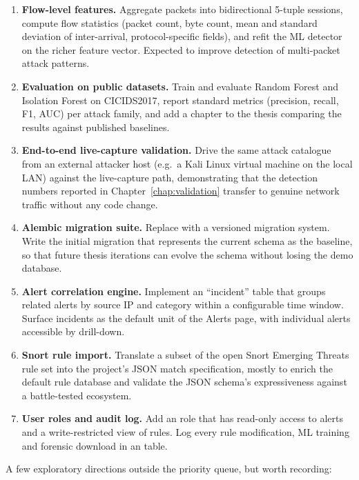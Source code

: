 \begin{enumerate}
  \item \textbf{Flow-level features.} Aggregate packets into
    bidirectional 5-tuple sessions, compute flow statistics
    (packet count, byte count, mean and standard deviation of
    inter-arrival, protocol-specific fields), and refit the ML
    detector on the richer feature vector. Expected to improve
    detection of multi-packet attack patterns.
  \item \textbf{Evaluation on public datasets.} Train and
    evaluate Random Forest and Isolation Forest on
    CICIDS2017, report standard metrics (precision, recall,
    F1, AUC) per attack family, and add a chapter to the
    thesis comparing the results against published baselines.
  \item \textbf{End-to-end live-capture validation.} Drive the
    same attack catalogue from an external attacker host
    (e.g.\ a Kali Linux virtual machine on the local LAN)
    against the live-capture path, demonstrating that the
    detection numbers reported in Chapter~\ref{chap:validation}
    transfer to genuine network traffic without any code
    change.
  \item \textbf{Alembic migration suite.} Replace
     with a versioned migration system.
    Write the initial migration that represents the current
    schema as the baseline, so that future thesis iterations
    can evolve the schema without losing the demo database.
  \item \textbf{Alert correlation engine.} Implement an
    ``incident'' table that groups related alerts by source IP
    and category within a configurable time window. Surface
    incidents as the default unit of the Alerts page, with
    individual alerts accessible by drill-down.
  \item \textbf{Snort rule import.} Translate a subset of the
    open Snort Emerging Threats rule set into the project's
    JSON match specification, mostly to enrich the default
    rule database and validate the JSON schema's
    expressiveness against a battle-tested ecosystem.
  \item \textbf{User roles and audit log.} Add an
     role that has read-only access to alerts
    and a write-restricted view of rules. Log every rule
    modification, ML training and forensic download in an
     table.
\end{enumerate}

A few exploratory directions outside the priority queue, but
worth recording:


